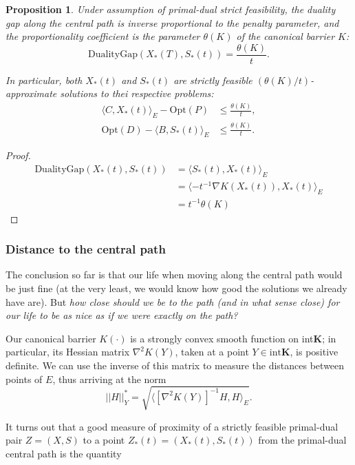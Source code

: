 \documentclass[11pt,a4paper]{article}
\newtheorem{prop}[thm]{Proposition}
\begin{document}
\begin{prop}
    Under assumption of primal-dual strict feasibility, the duality gap along the central path is inverse proportional to the penalty parameter, and the proportionality coefficient is the parameter $\theta(K)$ of the canonical barrier $K$:
    \[\text{DualityGap}(X_*(T), S_*(t)) = \frac{\theta(K)}{t}.\]
    
    In particular, both $X_*(t)$ and $S_*(t)$ are strictly feasible $(\theta(K)/t)$-approximate solutions to thei respective problems:
    \begin{align*}
        \langle C, X_*(t)\rangle_E -\text{Opt}(P) &\leq \frac{\theta(K)}{t},\\
        \text{Opt}(D)-\langle B, S_*(t)\rangle_E &\leq \frac{\theta(K)}{t}.
    \end{align*}
\end{prop}

\begin{proof}
\begin{align*}
    \text{DualityGap}(X_*(t), S_*(t))
    &= \langle S_*(t), X_*(t)\rangle_E\\
    &= \langle -t^{-1}\nabla K(X_*(t)), X_*(t)\rangle_E\\
    &= t^{-1}\theta(K)
\end{align*}
\end{proof}

\subsubsection{Distance to the central path}

The conclusion so far is that our life when moving along the central path would be just fine (at the very least, we would know how good the solutions we already have are). But \textit{how close should we be to the path (and in what sense close) for our life to be as nice as if we were exactly on the path?}

Our canonical barrier $K(\cdot)$ is a strongly convex smooth function on int$\textbf{K}$; in particular, its Hessian matrix $\nabla^2 K(Y)$, taken at a point $Y \in \text{int}\textbf{K}$, is positive definite. We can use the inverse of this matrix to measure the distances between points of $E$, thus arriving at the norm
\[||H||^*_Y = \sqrt{\langle[\nabla^2 K(Y)]^{-1}H,H \rangle_E}.\]

It turns out that a good measure of proximity of a strictly feasible primal-dual pair $Z = (X,S)$ to a point $Z_*(t) = (X_*(t), S_*(t))$ from the primal-dual central path is the quantity
\end{document}
